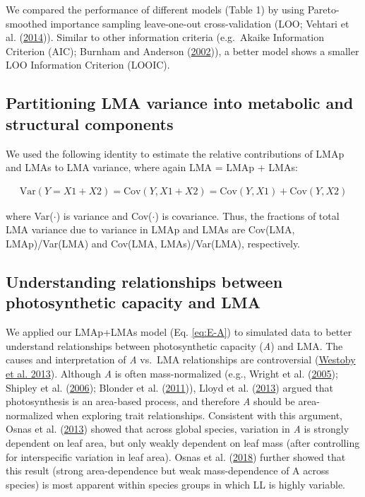 \documentclass[
  12pt,
  a4paper,
,tablecaptionabove
]{scrartcl}
\begin{document}
We compared the performance of different models (Table 1) by using Pareto-smoothed importance sampling leave-one-out cross-validation (LOO; Vehtari et al. (\protect\hyperlink{ref-Vehtari2014}{2014})).
Similar to other information criteria (e.g.~Akaike Information Criterion (AIC); Burnham and Anderson (\protect\hyperlink{ref-Burnham2002}{2002})), a better model shows a smaller LOO Information Criterion (LOOIC).

\hypertarget{partitioning-lma-variance-into-metabolic-and-structural-components}{%
\subsection{Partitioning LMA variance into metabolic and structural components}\label{partitioning-lma-variance-into-metabolic-and-structural-components}}

We used the following identity to estimate the relative contributions of LMAp and LMAs to LMA variance, where again LMA = LMAp + LMAs:

\begin{align}
\mathrm{Var}(Y = X1 + X2) = \mathrm{Cov}(Y, X1+X2) = \mathrm{Cov}(Y,X1) + \mathrm{Cov}(Y,X2) \tag{7}
\end{align}

where Var(\(\cdot\)) is variance and Cov(\(\cdot\)) is covariance.
Thus, the fractions of total LMA variance due to variance in LMAp and LMAs are Cov(LMA, LMAp)/Var(LMA) and Cov(LMA, LMAs)/Var(LMA), respectively.

\hypertarget{understanding-relationships-between-photosynthetic-capacity-and-lma}{%
\subsection{Understanding relationships between photosynthetic capacity and LMA}\label{understanding-relationships-between-photosynthetic-capacity-and-lma}}

We applied our LMAp+LMAs model (Eq. \eqref{eq:E-A}) to simulated data to better understand relationships between photosynthetic capacity (\emph{A}) and LMA.
The causes and interpretation of \emph{A} vs.~LMA relationships are controversial (\protect\hyperlink{ref-Westoby2013}{Westoby et al. 2013}).
Although \emph{A} is often mass-normalized (e.g., Wright et al. (\protect\hyperlink{ref-Wright2005}{2005}); Shipley et al. (\protect\hyperlink{ref-Shipley2006}{2006}); Blonder et al. (\protect\hyperlink{ref-Blonder2011}{2011})), Lloyd et al. (\protect\hyperlink{ref-Lloyd2013}{2013}) argued that photosynthesis is an area-based process, and therefore \emph{A} should be area-normalized when exploring trait relationships.
Consistent with this argument, Osnas et al. (\protect\hyperlink{ref-Osnas2013}{2013}) showed that across global species, variation in \emph{A} is strongly dependent on leaf area, but only weakly dependent on leaf mass (after controlling for interspecific variation in leaf area).
Osnas et al. (\protect\hyperlink{ref-Osnas2018}{2018}) further showed that this result (strong area-dependence but weak mass-dependence of A across species) is most apparent within species groups in which LL is highly variable.
\end{document}
